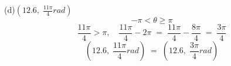 \documentclass[12pt, a4paper]{article}
\begin{document}
	(d)\quad $\left(12.6,\;\frac{11\pi}{4}rad\right)$
		\begin{equation}
			\tag*{}
			-\pi<\theta\geq\pi
		\end{equation}
		\begin{equation}
			\tag*{}
			\frac{11\pi}{4}>\pi,\quad
			\frac{11\pi}{4}-2\pi\;=\;
			\frac{11\pi}{4}-\frac{8\pi}{4}\;=\;
			\frac{3\pi}{4}
		\end{equation}
		\begin{equation}
			\tag*{}
			\left(12.6,\;\frac{11\pi}{4}rad\right)\;=\;
			\left(12.6,\;\frac{3\pi}{4}rad\right)
		\end{equation}
		
\end{document}
